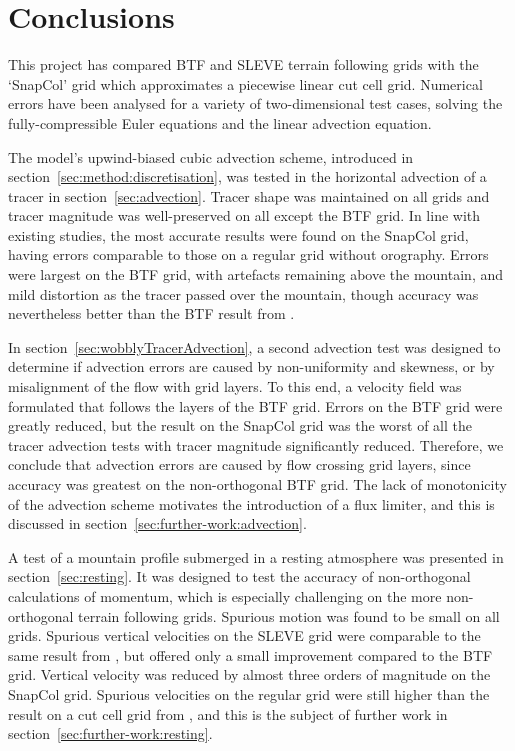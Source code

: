 \chapter{Conclusions}
\label{sec:conclusions}

This project has compared BTF and SLEVE terrain following grids with the `SnapCol' grid which approximates a piecewise linear cut cell grid.   Numerical errors have been analysed for a variety of two-dimensional test cases, solving the fully-compressible Euler equations and the linear advection equation.

The model's upwind-biased cubic advection scheme, introduced in section~\ref{sec:method:discretisation}, was tested in the horizontal advection of a tracer in section~\ref{sec:advection}.  Tracer shape was maintained on all grids and tracer magnitude was well-preserved on all except the BTF grid.  In line with existing studies, the most accurate results were found on the SnapCol grid, having errors comparable to those on a regular grid without orography.  Errors were largest on the BTF grid, with artefacts remaining above the mountain, and mild distortion as the tracer passed over the mountain, though accuracy was nevertheless better than the BTF result from \textcite{schaer2002}.

In section~\ref{sec:wobblyTracerAdvection}, a second advection test was designed to determine if advection errors are caused by non-uniformity and skewness, or by misalignment of the flow with grid layers.  To this end, a velocity field was formulated that follows the layers of the BTF grid.
Errors on the BTF grid were greatly reduced, but the result on the SnapCol grid was the worst of all the tracer advection tests with tracer magnitude significantly reduced.  Therefore, we conclude that advection errors are caused by flow crossing grid layers, since accuracy was greatest on the non-orthogonal BTF grid.  The lack of monotonicity of the advection scheme motivates the introduction of a flux limiter, and this is discussed in section~\ref{sec:further-work:advection}.

A test of a mountain profile submerged in a resting atmosphere was presented in section~\ref{sec:resting}.  It was designed to test the accuracy of non-orthogonal calculations of momentum, which is especially challenging on the more non-orthogonal terrain following grids.  Spurious motion was found to be small on all grids.  Spurious vertical velocities on the SLEVE grid were comparable to the same result from \textcite{schaer2002}, but offered only a small improvement compared to the BTF grid.  Vertical velocity was reduced by almost three orders of magnitude on the SnapCol grid.  Spurious velocities on the regular grid were still higher than the result on a cut cell grid from \textcite{good2013}, and this is the subject of further work in section~\ref{sec:further-work:resting}.

